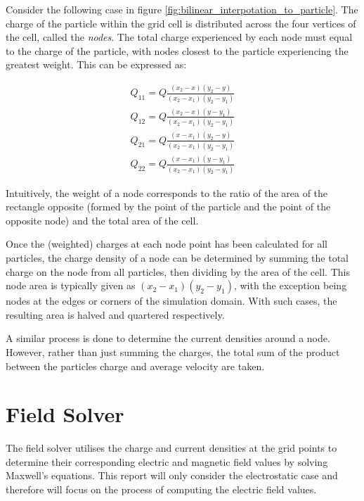 Consider the following case in figure \ref{fig:bilinear_interpotation_to_particle}. The charge of the particle within the grid cell is distributed across the four vertices of the cell, called the \textit{nodes}. The total charge experienced by each node must equal to the charge of the particle, with nodes closest to the particle experiencing the greatest weight. This can be expressed as:

\begin{equation}
\begin{aligned}
	Q_{11} = Q\frac{(x_2 - x) (y_2 - y)}{(x_2 - x_1) (y_2 - y_1)} \\
	Q_{12} = Q\frac{(x_2 - x) (y - y_1)}{(x_2 - x_1) (y_2 - y_1)} \\
	Q_{21} = Q\frac{(x - x_1) (y_2 - y)}{(x_2 - x_1) (y_2 - y_1)} \\
	Q_{22} = Q\frac{(x - x_1) (y - y_1)}{(x_2 - x_1) (y_2 - y_1)}
\end{aligned}
\end{equation}

Intuitively, the weight of a node corresponds to the ratio of the area of the rectangle opposite (formed by the point of the particle and the point of the opposite node) and the total area of the cell. 

Once the (weighted) charges at each node point has been calculated for all particles, the charge density of a node can be determined by summing the total charge on the node from all particles, then dividing by the area of the cell. This node area is typically given as $(x_2 - x_1) (y_2 - y_1)$, with the exception being nodes at the edges or corners of the simulation domain. With such cases, the resulting area is halved and quartered respectively.  

A similar process is done to determine the current densities around a node. However, rather than just summing the charges, the total sum of the product between the particles charge and average velocity are taken.


\section{Field Solver}

The field solver utilises the charge and current densities at the grid points to determine their corresponding electric and magnetic field values by solving Maxwell's equations. This report will only consider the electrostatic case and therefore will focus on the process of computing the electric field values. 

